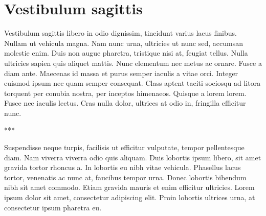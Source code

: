 \chapter{Vestibulum sagittis}

Vestibulum sagittis libero in odio dignissim, tincidunt varius lacus finibus. Nullam ut vehicula magna. Nam nunc urna, ultricies ut nunc sed, accumsan molestie enim. Duis non augue pharetra, tristique nisi at, feugiat tellus. Nulla ultricies sapien quis aliquet mattis. Nunc elementum nec metus ac ornare. Fusce a diam ante. Maecenas id massa et purus semper iaculis a vitae orci. Integer euismod ipsum nec quam semper consequat. Class aptent taciti sociosqu ad litora torquent per conubia nostra, per inceptos himenaeos. Quisque a lorem lorem. Fusce nec iaculis lectus. Cras nulla dolor, ultrices at odio in, fringilla efficitur nunc.

\centerline{***}

Suspendisse neque turpis, facilisis ut efficitur vulputate, tempor pellentesque diam. Nam viverra viverra odio quis aliquam. Duis lobortis ipsum libero, sit amet gravida tortor rhoncus a. In lobortis eu nibh vitae vehicula. Phasellus lacus tortor, venenatis ac nunc at, faucibus tempor urna. Donec lobortis bibendum nibh sit amet commodo. Etiam gravida mauris et enim efficitur ultricies. Lorem ipsum dolor sit amet, consectetur adipiscing elit. Proin lobortis ultrices urna, at consectetur ipsum pharetra eu.
